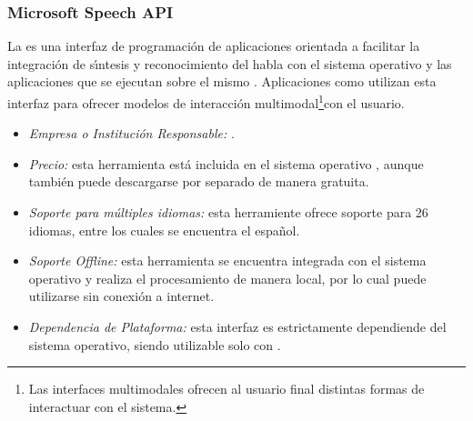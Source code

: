 \subsubsection{Microsoft Speech API}
\label{sec:microsoft}

La  es una interfaz de programaci\'on de aplicaciones orientada a
facilitar la integraci\'on de s{\'\i}ntesis y reconocimiento del habla con el sistema operativo 
y las aplicaciones que se ejecutan sobre el mismo \cite{MicrosoftSpeech}. Aplicaciones como 
utilizan esta interfaz para ofrecer modelos de interacci\'on multimodal\footnote{Las interfaces multimodales
ofrecen al usuario final distintas formas de interactuar con el sistema.}con el usuario.

\begin{itemize}
	\item \emph{Empresa o Instituci\'on Responsable:} .
	\item \emph{Precio:} esta herramienta est\'a incluida en el sistema operativo , aunque
	tambi\'en puede descargarse por separado de manera gratuita.
	\item \emph{Soporte para m\'ultiples idiomas:} esta herramiente ofrece soporte para 26 idiomas,
	entre los cuales se encuentra el espa\~nol.
	\item \emph{Soporte Offline:} esta herramienta se encuentra integrada con el sistema operativo
	y realiza el procesamiento de manera local, por lo cual puede utilizarse sin conexi\'on a internet.
	\item \emph{Dependencia de Plataforma:} esta interfaz es estrictamente dependiende del sistema operativo,
	siendo utilizable solo con .
\end{itemize}
